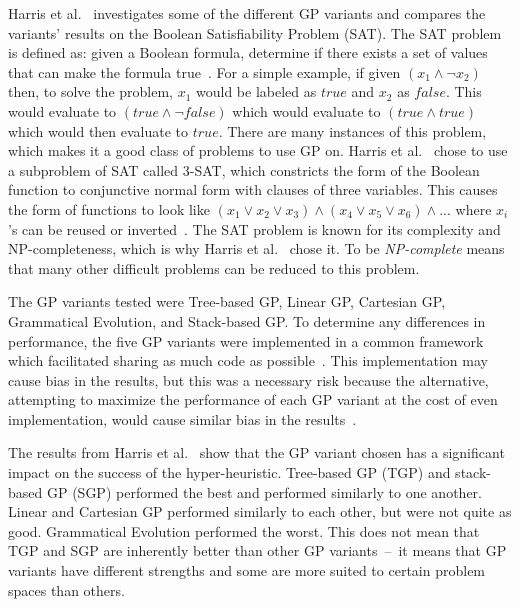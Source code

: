 \documentclass{sig-alternate}
\begin{document}
Harris et al.~\cite{harris:2015} investigates some of the different GP variants and compares the variants' results on the Boolean Satisfiability Problem (SAT). The SAT problem is defined as: given a Boolean formula, determine if there exists a set of values that can make the formula true~\cite{harris:2015}. For a simple example, if given $(x_{1} \wedge \neg x_{2})$ then, to solve the problem, $x_{1}$ would be labeled as $true$ and $x_{2}$ as $false$. This would evaluate to $(true \wedge \neg false)$ which would evaluate to $(true \wedge true)$ which would then evaluate to $true$. There are many instances of this problem, which makes it a good class of problems to use GP on. Harris et al.~\cite{harris:2015} chose to use a subproblem of SAT called 3-SAT, which constricts the form of the Boolean function to conjunctive normal form with clauses of three variables. This causes the form of functions to look like $(x_{1} \vee x_{2} \vee x_{3}) \wedge (x_{4} \vee x_{5} \vee x_{6}) \wedge ...$ where $x_{i}$'s can be reused or inverted~\cite{harris:2015}. The SAT problem is known for its complexity and NP-completeness, which is why Harris et al.~\cite{harris:2015} chose it. To be \textit{NP-complete} means that many other difficult problems can be reduced to this problem. 

The GP variants tested were Tree-based GP, Linear GP, Cartesian GP, Grammatical Evolution, and Stack-based GP. To determine any differences in performance, the five GP variants were implemented in a common framework which facilitated sharing as much code as possible~\cite{harris:2015}. This implementation may cause bias in the results, but this was a necessary risk because the alternative, attempting to maximize the performance of each GP variant at the cost of even implementation, would cause similar bias in the results~\cite{harris:2015}.

The results from Harris et al.~\cite{harris:2015} show that the GP variant chosen has a significant impact on the success of the hyper-heuristic. Tree-based GP (TGP) and stack-based GP (SGP) performed the best and performed similarly to one another. Linear and Cartesian GP performed similarly to each other, but were not quite as good. Grammatical Evolution performed the worst. This does not mean that TGP and SGP are inherently better than other GP variants~--~it means that GP variants have different strengths and some are more suited to certain problem spaces than others.
\end{document}
